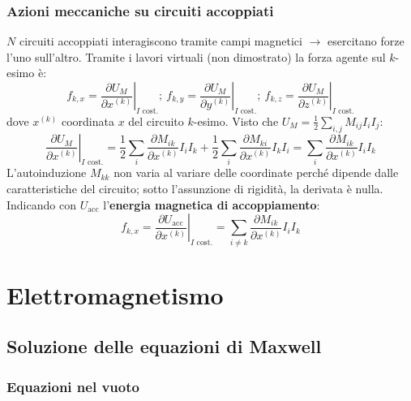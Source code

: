 \documentclass[10pt, a4paper]{scrartcl}
\newcommand*\Eval[3]{\left.#1\right\rvert_{#2}^{#3}}
\numberwithin{equation}{subsection}
\theoremstyle{style1}
\begin{document}
\subsubsection{Azioni meccaniche su circuiti accoppiati}

$N$ circuiti accoppiati interagiscono tramite campi magnetici $\to$ esercitano forze l'uno sull'altro. Tramite i lavori virtuali (non dimostrato) la forza agente sul $k$-esimo \`e:
\begin{equation}
	f_{k,x} = \Eval{\frac{\partial U_M}{\partial x^{(k)} } }{I \text{ cost.}}{} ; \ f_{k,y} = \Eval{\frac{\partial U_M}{\partial y^{(k)} } }{I \text{ cost.}}{} ; \ f_{k,z} = \Eval{\frac{\partial U_M}{\partial z^{(k)} } }{I \text{ cost.}}{}
\end{equation}
dove $x^{(k)} $ coordinata $x$ del circuito $k$-esimo. Visto che $U_M = \frac{1}{2}\sum_{i,j}^{} M_{ij} I_i I_j$:
\[
\Eval{\frac{\partial U_M}{\partial x^{(k)} } }{I \text{ cost.}}{} = \frac{1}{2}\sum_{i}^{} \frac{\partial M_{ik} }{\partial x^{(k)} } I_i I_k + \frac{1}{2}\sum_{i}^{} \frac{\partial M_{ki} }{\partial x^{(k)} } I_kI_i= \sum_{i}^{} \frac{\partial M_{ik} }{\partial x^{(k)} } I_iI_k
\] 
L'autoinduzione $M_{kk} $ non varia al variare delle coordinate perch\'e dipende dalle caratteristiche del circuito; sotto l'assunzione di rigidit\`a, la derivata \`e nulla. Indicando con $U_\text{acc}$ l'\textbf{energia magnetica di accoppiamento}:
\begin{equation}
	f_{k,x} = \Eval{\frac{\partial U_\text{acc}}{\partial x^{(k)} } }{I \text{ cost.}}{}=\sum_{i\neq k}^{} \frac{\partial M_{ik} }{\partial x^{(k)} } I_iI_k
\end{equation}

\newpage
\section{Elettromagnetismo}

\subsection{Soluzione delle equazioni di Maxwell}

\subsubsection{Equazioni nel vuoto}
\end{document}
